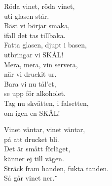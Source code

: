 \documentclass[a6paper,10pt]{article}
\begin{document}
\setlength{\oddsidemargin}{-0.47in}
\noindent
\begin{center}
\end{center}
\begin{lyrics}
Röda vinet, röda vinet,\\
uti glasen står.\\
Bäst vi börjar smaka,\\
ifall det tas tillbaka.\\
Fatta glasen, djupt i basen,\\
utbringar vi SKÅL!
\vspace{5pt}\\
Mera, mera, vin servera,\\
när vi druckit ur.\\
Bara vi nu tål'et,\\
se upp för alkoholet.\\
Tag nu skvätten, i falsetten,\\
om igen en SKÅL!
\end{lyrics}
\vspace{40pt}
\begin{center}
\end{center}
\begin{lyrics}
Vinet väntar, vinet väntar,\\
på att drucket bli.\\
Det är smått förläget,\\
känner ej till vägen.\\
Sträck fram handen, fukta tanden.\\
Så går vinet ner.¨
\end{lyrics}
\end{document}
